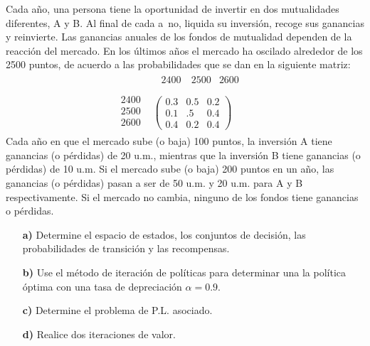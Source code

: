 \documentclass[twoside]{article}
\begin{document}
\newpage 

\begin{ejercicio}{3}

Cada año, una persona tiene la oportunidad de invertir en dos mutualidades diferentes, A y B.
Al final de cada a~no, liquida su inversión, recoge sus ganancias y reinvierte. Las ganancias anuales
de los fondos de mutualidad dependen de la reacción del mercado. En los últimos años el mercado
ha oscilado alrededor de los 2500 puntos, de acuerdo a las probabilidades que se dan en la siguiente
matriz:
\[
\begin{array}{cc}
  \begin{matrix}
 
\end{matrix} & \begin{matrix}
~~2400 & ~2500 & 2600~  & \\ 
\end{matrix} \\
\begin{matrix}
2400 \\
2500 \\
2600 \\
\end{matrix}
 & \begin{pmatrix}
0.3 & 0.5 & 0.2 \\
0.1 & .5 & 0.4 \\
0.4 & 0.2 & 0.4
\end{pmatrix}
\end{array}
\]
Cada año en que el mercado sube (o baja) 100 puntos, la inversión A tiene ganancias (o pérdidas)
de 20 u.m., mientras que la inversión B tiene ganancias (o pérdidas) de 10 u.m. Si el mercado sube
(o baja) 200 puntos en un año, las ganancias (o pérdidas) pasan a ser de 50 u.m. y 20 u.m. para A
y B respectivamente. Si el mercado no cambia, ninguno de los fondos tiene ganancias o pérdidas.
\begin{itemize}
\item[\textbf{a)}] Determine el espacio de estados, los conjuntos de decisión, las probabilidades de transición y
las recompensas.
\item[\textbf{b)}] Use el método de iteración de políticas para determinar una la política óptima con una tasa de
depreciación $\alpha = 0.9$.
\item[\textbf{c)}] Determine el problema de P.L. asociado.
\item[\textbf{d)}] Realice dos iteraciones de valor.
\end{itemize}

\begin{solucion}

\end{solucion}
\end{ejercicio}
\end{document}
